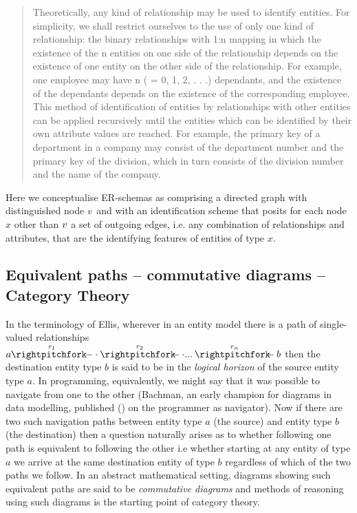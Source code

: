 \begin{quote}
Theoretically, any kind of relationship may be used to identify entities. For
simplicity, we shall restrict ourselves to the use of only one kind of relationship:
the binary relationships with 1:n mapping in which the existence of the n entities
on one side of the relationship depends on the existence of one entity on the other
side of the relationship. For example, one employee may have n ( = 0, 1, 2, . . .)
dependants, and the existence of the dependants depends on the existence of the
corresponding employee.
This method of identification of entities by relationships with other entities can
be applied recursively until the entities which can be identified by their own attribute
values are reached. For example, the primary key of a department in a
company may consist of the department number and the primary key of the
division, which in turn consists of the division number and the name of the company.
\end{quote}

Here we conceptualise ER-schemas as comprising a directed graph with distinguished 
node $v$ and with an identification scheme that posits for each node $x$ other than $v$
a set of outgoing edges, i.e. any combination of relationships and attributes, that are
the identifying features of entities of type $x$.
\iffalse
An identifying set of features  $i_1,...i_n$ for an entity type $x$ specifies a jointly injective set of functions(the set of functions $f_1,...f_n$ are said to be jointly injective iff the function:
$$
\tuple{f_1,f2,,,,f_n}: x \morph \veee \times \veee ... \times \veee
$$
is injective).
\fi

\subsection{Equivalent paths -- commutative diagrams -- Category Theory}
In the terminology of Ellis\cite{ellis1982}, wherever in an entity model there is a path of single-valued relationships 
$\overset{r_1}{a \rightpitchfork \hspace{-0.35em} -  \cdot} \overset{r_2}{\rightpitchfork \hspace{-0.35em} -} \cdot ... \overset{r_n}{\rightpitchfork \hspace{-0.35em} -} b$
then the destination entity type $b$ is said to be in the \textit{logical horizon}  of the source entity type $a$. In programming, equivalently, 
we might say that it was possible to navigate from one to the other (Bachman, an early champion for diagrams in data modelling, published (\cite{Bachman1973}) on the programmer as navigator). Now if there are two such navigation paths between entity type $a$ (the source) and entity type $b$ (the destination) then a question naturally arises as to whether following one path is equivalent to
following the other i.e whether starting at any entity of type $a$ we arrive at the same destination entity of type $b$ regardless of which of the two paths we follow. In an abstract mathematical setting, diagrams showing such equivalent
paths are said to be \textit{commutative diagrams} and methods of reasoning using such diagrams is the starting point of category theory. 

